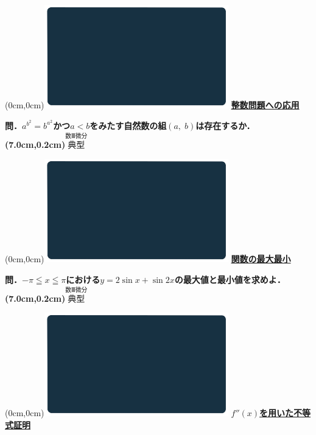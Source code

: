 \documentclass[10pt,
fleqn,
dvipdfmx,
uplatex
]{jsarticle}
\begin{document}
\at(0cm,0cm){\includegraphics[width=8cm,bb=0 0 1920 1080]{./youtube/thumbnails/templates/smart_background/数III微分.jpeg}}
{\color{orange}\bf\boldmath\huge\underline{整数問題への応用}}\vspace{0.3zw}

\LARGE 
\bf\boldmath 問．$a^{b^2}=b^{a^2}$かつ$a<b$をみたす自然数の組$\left(a,\;b\right)$は存在するか．
\at(7.0cm,0.2cm){\small\color{bradorange}$\overset{\text{数Ⅲ微分}}{\text{典型}}$}


\newpage



\at(0cm,0cm){\includegraphics[width=8cm,bb=0 0 1920 1080]{./youtube/thumbnails/templates/smart_background/数III微分.jpeg}}
{\color{orange}\bf\boldmath\huge\underline{関数の最大最小}}\vspace{0.3zw}

\LARGE 
\bf\boldmath 問．$-\pi \leqq x\leqq \pi$における$y=2\sin x+\sin 2x$の最大値と最小値を求めよ．
\at(7.0cm,0.2cm){\small\color{bradorange}$\overset{\text{数Ⅲ微分}}{\text{典型}}$}


\newpage



\at(0cm,0cm){\includegraphics[width=8cm,bb=0 0 1920 1080]{./youtube/thumbnails/templates/smart_background/数III微分.jpeg}}
{\color{orange}\bf\boldmath\LARGE\underline{$f''\left(x\right)$を用いた不等式証明}}\vspace{0.3zw}
\end{document}
